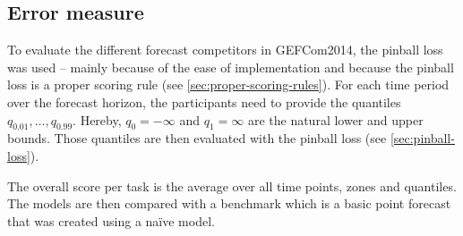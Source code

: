 \subsection{Error measure}

To evaluate the different forecast competitors in GEFCom2014, 
the pinball loss was used -- mainly because of the ease of implementation 
and because the pinball loss is a proper scoring rule (see \ref{sec:proper-scoring-rules}).
For each time period over the forecast horizon, the participants need to 
provide the quantiles \(q_{0.01}, \ldots, q_{0.99}\). 
Hereby, \(q_0 = -\infty\) and \(q_1 = \infty\) are the natural lower and upper bounds. 
Those quantiles are then evaluated with the pinball loss (see \ref{sec:pinball-loss}).

The overall score per task is the average over all time points, zones and quantiles.
The models are then compared with a benchmark which is a basic point forecast 
that was created using a na\"{i}ve model.